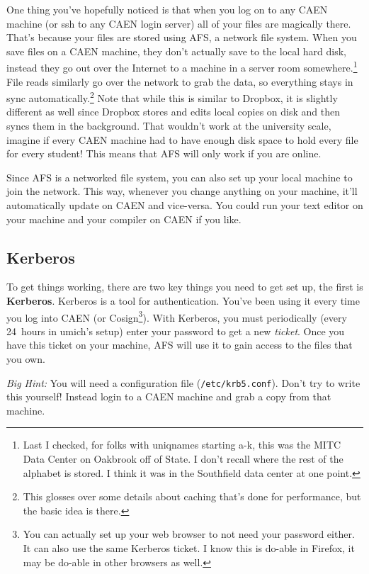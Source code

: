 \documentclass{article}
\begin{document}
One thing you've hopefully noticed is that when you log on to any CAEN machine
(or ssh to any CAEN login server) all of your files are magically there.
That's because your files are stored using AFS, a network file system. When
you save files on a CAEN machine, they don't actually save to the local hard
disk, instead they go out over the Internet to a machine in a server room
somewhere.\footnote{Last I checked, for folks with uniqnames starting a-k,
this was the MITC Data Center on Oakbrook off of State. I don't recall where
the rest of the alphabet is stored. I think it was in the Southfield data
center at one point.} File reads similarly go over the network to grab the
data, so everything stays in sync automatically.\footnote{This glosses over
  some details about caching that's done for performance, but the basic idea
  is there.} Note that while this is similar to Dropbox, it is slightly
different as well since Dropbox stores and edits local copies on disk and then
syncs them in the background. That wouldn't work at the university scale,
imagine if every CAEN machine had to have enough disk space to hold every file
for every student! This means that AFS will only work if you are online.

Since AFS is a networked file system, you can also set up your local machine
to join the network.  This way, whenever you change anything on your machine,
it'll automatically update on CAEN and vice-versa. You could run your text
editor on your machine and your compiler on CAEN if you like.

\subsection*{Kerberos}

To get things working, there are two key things you need to get set up, the
first is \textbf{Kerberos}. Kerberos is a tool for authentication. You've been
using it every time you log into CAEN (or Cosign\footnote{
  You can actually set up your web browser to not need your password either.
  It can also use the same Kerberos ticket. I know this is do-able in Firefox,
  it may be do-able in other browsers as well.
}). With Kerberos, you must periodically (every 24~hours in umich's setup)
enter your password to get a new \emph{ticket}. Once you have this ticket on
your machine, AFS will use it to gain access to the files that you own.

\emph{Big Hint:} You will need a configuration file (\texttt{/etc/krb5.conf}).
Don't try to write this yourself! Instead login to a CAEN machine and grab a
copy from that machine.
\end{document}
